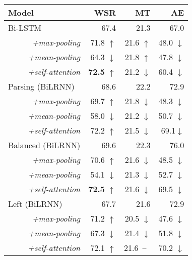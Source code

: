 \documentclass[11pt,a4paper]{article}
\begin{document}
\begin{table}[t]
    \centering
    \begin{tabular}{lrrr}
        \toprule
         \textbf{Model} & \textbf{WSR} & \textbf{MT} & \textbf{AE} \\
         \midrule
         Bi-LSTM                        & 67.4  & 21.3  & 67.0  \\
         \multicolumn{1}{r}{\textit{+max-pooling}}      & 71.8 $\uparrow$ & 21.6 $\uparrow$ & 48.0  $\downarrow$ \\
         \multicolumn{1}{r}{\textit{+mean-pooling}}      & 64.3 $\downarrow$  & 21.8  $\uparrow$ & 47.8 $\downarrow$  \\
         \multicolumn{1}{r}{\textit{+self-attention}} & \textbf{72.5} $\uparrow$ & 21.2 $\downarrow$ & 60.4  $\downarrow$ \\
         \midrule
         Parsing (BiLRNN)               & 68.6  & 22.2  & 72.9  \\
         \multicolumn{1}{r}{\textit{+max-pooling}}       & 69.7 $\uparrow$ & 21.8  $\downarrow$     & 48.3 $\downarrow$  \\
         \multicolumn{1}{r}{\textit{+mean-pooling}}      & 58.0 $\downarrow$   & 21.2 $\downarrow$  & 50.7  $\downarrow$ \\
         \multicolumn{1}{r}{\textit{+self-attention}} & 72.2 $\uparrow$ & 21.5 $\downarrow$  & 69.1$\downarrow$  \\
         \cmidrule(lr){2-4}
         Balanced (BiLRNN)              & 69.6  & 22.3 & 76.0  \\
         \multicolumn{1}{r}{\textit{+max-pooling}}       & 70.6  $\uparrow$ & 21.6   $\downarrow$  & 48.5   $\downarrow$  \\
         \multicolumn{1}{r}{\textit{+mean-pooling}}      & 54.1   $\downarrow$  & 21.3   $\downarrow$  & 52.7 $\downarrow$    \\
         \multicolumn{1}{r}{\textit{+self-attention}} & \textbf{72.5} $\uparrow$ & 21.6 $\downarrow$   & 69.5 $\downarrow$   \\ 
         \cmidrule(lr){2-4}
		 Left (BiLRNN) & 67.7 & 21.6 & 72.9 \\
         \multicolumn{1}{r}{\textit{+max-pooling}}       & 71.2 $\uparrow$ &  20.5 $\downarrow$   &  47.6  $\downarrow$   \\
         \multicolumn{1}{r}{\textit{+mean-pooling}}      & 67.3 $\downarrow$   & 21.4 $\downarrow$   &  51.8 $\downarrow$   \\
		 \multicolumn{1}{r}{\textit{+self-attention}} & 72.1 $\uparrow$ & 21.6~--~& 70.2 $\downarrow$    \\

\end{tabular}
\end{table}
\end{document}
